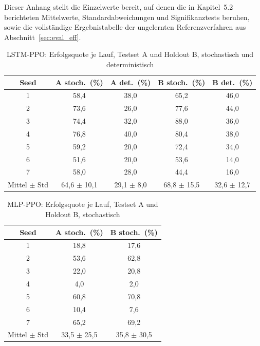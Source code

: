 \documentclass[
  a4paper,
  11pt,
  twoside,
  BCOR=8mm,           %
  headings=big,
  numbers=noenddot,
  listof=totoc,       %
  captions=tableheading,
]{scrreprt}
\begin{document}
Dieser Anhang stellt die Einzelwerte bereit, auf denen die in Kapitel~5.2 berichteten Mittelwerte, Standardabweichungen und Signifikanztests beruhen, sowie die vollständige Ergebnistabelle der ungelernten Referenzverfahren aus Abschnitt~\ref{sec:eval_eff}.

\begin{table}[H]
    \centering
    \caption{LSTM-PPO: Erfolgsquote je Lauf, Testset A und Holdout B, stochastisch und deterministisch}
    \label{tab:rohdaten_lstm}
    \begin{tabular}{ccccc}
        \toprule
        \textbf{Seed} & \textbf{A stoch.\ (\%)} & \textbf{A det.\ (\%)} & \textbf{B stoch.\ (\%)} & \textbf{B det.\ (\%)} \\
        \midrule
        1 & 58,4 & 38,0 & 65,2 & 46,0 \\
        2 & 73,6 & 26,0 & 77,6 & 44,0 \\
        3 & 74,4 & 32,0 & 88,0 & 36,0 \\
        4 & 76,8 & 40,0 & 80,4 & 38,0 \\
        5 & 59,2 & 20,0 & 72,4 & 34,0 \\
        6 & 51,6 & 20,0 & 53,6 & 14,0 \\
        7 & 58,0 & 28,0 & 44,4 & 16,0 \\
        \midrule
        Mittel $\pm$ Std & 64,6 $\pm$ 10,1 & 29,1 $\pm$ 8,0 & 68,8 $\pm$ 15,5 & 32,6 $\pm$ 12,7 \\
        \bottomrule
    \end{tabular}
\end{table}

\begin{table}[H]
    \centering
    \caption{MLP-PPO: Erfolgsquote je Lauf, Testset A und Holdout B, stochastisch}
    \label{tab:rohdaten_mlp}
    \begin{tabular}{ccc}
        \toprule
        \textbf{Seed} & \textbf{A stoch.\ (\%)} & \textbf{B stoch.\ (\%)} \\
        \midrule
        1 & 18,8 & 17,6 \\
        2 & 53,6 & 62,8 \\
        3 & 22,0 & 20,8 \\
        4 & 4,0 & 2,0 \\
        5 & 60,8 & 70,8 \\
        6 & 10,4 & 7,6 \\
        7 & 65,2 & 69,2 \\
        \midrule
        Mittel $\pm$ Std & 33,5 $\pm$ 25,5 & 35,8 $\pm$ 30,5 \\
        \bottomrule
    \end{tabular}
\end{table}
\end{document}
